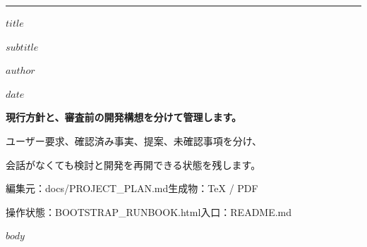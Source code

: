 \documentclass[11pt,a4paper]{article}
\begin{document}
\begin{titlepage}
\vspace*{22mm}
{\color{accent}\rule{\linewidth}{1.2pt}}\par\vspace{12mm}
{\fontsize{27}{38}\selectfont\bfseries\color{ink}$title$\par}
\vspace{8mm}
{\LARGE\bfseries $subtitle$\par}
\vspace{17mm}
{\large $author$\par}
\vspace{4mm}
{\large $date$\par}
\vfill
{\large\bfseries 現行方針と、審査前の開発構想を分けて管理します。}\par
\vspace{3mm}
ユーザー要求、確認済み事実、提案、未確認事項を分け、\par
会話がなくても検討と開発を再開できる状態を残します。\par
\vspace{7mm}
{\small 編集元：docs/PROJECT\_PLAN.md\quad 生成物：TeX / PDF}\par
{\small 操作状態：BOOTSTRAP\_RUNBOOK.html\quad 入口：README.md}\par
\end{titlepage}
\tableofcontents
\clearpage
$body$
\end{document}
